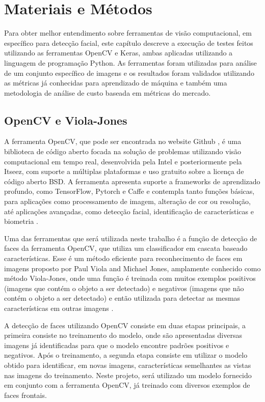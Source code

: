 \chapter{Materiais e Métodos}\label{cap:ferramentas}

Para obter melhor entendimento sobre ferramentas de visão computacional, em específico para detecção facial, este capítulo descreve a execução de testes feitos utilizando as ferramentas OpenCV e Keras, ambas aplicadas utilizando a linguagem de programação Python.
As ferramentas foram utilizadas para análise de um conjunto específico de imagens e os resultados foram validados utilizando as métricas já conhecidas para aprendizado de máquina e também uma metodologia de análise de custo baseada em métricas do mercado.

\section{OpenCV e Viola-Jones}

A ferramenta OpenCV, que pode ser encontrada no website Github \cite{itseez2015opencv}, é uma biblioteca de código aberto focada na solução de problemas utilizando visão computacional em tempo real, desenvolvida pela Intel e posteriormente pela Itseez, com suporte a múltiplas plataformas e uso gratuito sobre a licença de código aberto BSD. A ferramenta apresenta suporte a frameworks de aprendizado profundo, como TensorFlow, Pytorch e Caffe e contempla tanto funções básicas, para aplicações como processamento de imagem, alteração de cor ou resolução, até aplicações avançadas, como detecção facial, identificação de características e biometria \cite{wiki:OpenCV}.

Uma das ferramentas que será utilizada neste trabalho é a função de detecção de faces da ferramenta OpenCV, que utiliza um classificador em cascata baseado características. Esse é um método eficiente para reconhecimento de faces em imagens proposto por Paul Viola and Michael Jones, amplamente conhecido como método Viola-Jones, onde uma função é treinada com muitos exemplos positivos (imagens que contém o objeto a ser detectado) e negativos (imagens que não contém o objeto a ser detectado) e então utilizada para detectar as mesmas características em outras imagens \cite{itseez2014theopencv}.

A detecção de faces utilizando OpenCV consiste em duas etapas principais, a primeira consiste no treinamento do modelo, onde são apresentadas diversas imagens já identificadas para que o modelo encontre padrões positivos e negativos. Após o treinamento, a segunda etapa consiste em utilizar o modelo obtido para identificar, em novas imagens, características semelhantes as vistas nas imagens do treinamento. Neste projeto, será utilizado um modelo fornecido em conjunto com a ferramenta OpenCV, já treinado com diversos exemplos de faces frontais.

